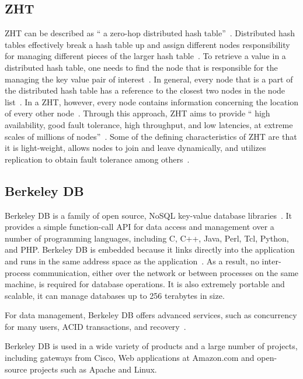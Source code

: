      \pv

\subsection{ZHT}

ZHT can be described as `` a zero-hop distributed hash
table''~\cite{datasys}. Distributed hash tables effectively break a
hash table up and assign different nodes responsibility for managing
different pieces of the larger hash table~\cite{wiley}. To retrieve a
value in a distributed hash table, one needs to find the node that is
responsible for the managing the key value pair of
interest~\cite{wiley}. In general, every node that is a part of the
distributed hash table has a reference to the closest two nodes in the
node list~\cite{wiley}. In a ZHT, however, every node contains
information concerning the location of every other
node~\cite{Li}. Through this approach, ZHT aims to provide `` high
availability, good fault tolerance, high throughput, and low
latencies, at extreme scales of millions of nodes''~\cite{Li}.  Some
of the defining characteristics of ZHT are that it is light-weight,
allows nodes to join and leave dynamically, and utilizes replication
to obtain fault tolerance among others~\cite{Li}.

     \pv
     
\subsection{Berkeley DB}

Berkeley DB is a family of open source, NoSQL key-value database
libraries~\cite{www-bdb-wiki}. It provides a simple function-call API
for data access and management over a number of programming languages,
including C, C++, Java, Perl, Tcl, Python, and PHP. Berkeley DB is
embedded because it links directly into the application and runs in
the same address space as the application~\cite{www-bdb-stanford}. As
a result, no inter-process communication, either over the network or
between processes on the same machine, is required for database
operations. It is also extremely portable and scalable, it can manage
databases up to 256 terabytes in size.
     
For data management, Berkeley DB offers advanced services, such as
concurrency for many users, ACID transactions, and
recovery~\cite{www-bdb}.
     
     Berkeley DB is used in a wide variety of products and a large
     number of projects, including gateways from Cisco, Web
     applications at Amazon.com and open-source projects such as
     Apache and Linux.

